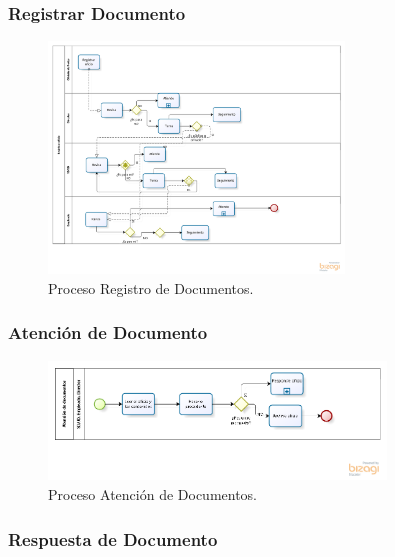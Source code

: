 \subsubsection{Registrar Documento}

	\begin{figure}[htbp!]
		\centering
			\includegraphics[width=0.7\textwidth]{images/procesoregistro}
		\caption{Proceso Registro de Documentos.}
	\end{figure}

\subsubsection{Atención de Documento}	

	\begin{figure}
		\centering
			\includegraphics[width=0.8\textwidth]{images/procesoatencion}
		\caption{Proceso Atención de Documentos.}
	\end{figure}

\subsubsection{Respuesta de Documento}	

